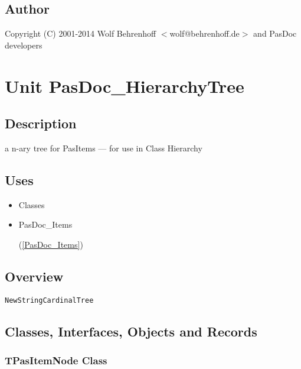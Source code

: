 \documentclass{report}
\newif\ifpdf
\begin{document}
\section{Author}
\par
Copyright (C) 2001-2014  Wolf Behrenhoff {$<$}wolf@behrenhoff.de{$>$} and PasDoc developers

\chapter{Unit PasDoc{\_}HierarchyTree}
\label{PasDoc_HierarchyTree}
\section{Description}
 a n{-}ary tree for PasItems --- for use in Class Hierarchy
\section{Uses}
\begin{itemize}
\item \begin{ttfamily}Classes\end{ttfamily}\item \begin{ttfamily}PasDoc{\_}Items\end{ttfamily}(\ref{PasDoc_Items})\end{itemize}
\section{Overview}
\begin{description}
\item[\texttt{\begin{ttfamily}TPasItemNode\end{ttfamily} Class}]
\item[\texttt{\begin{ttfamily}TStringCardinalTree\end{ttfamily} Class}]
\end{description}
\begin{description}
\item[\texttt{NewStringCardinalTree}]
\end{description}
\section{Classes, Interfaces, Objects and Records}
\ifpdf
\subsection*{\large{\textbf{TPasItemNode Class}}\normalsize\hspace{1ex}\hrulefill}
\else
\end{document}
